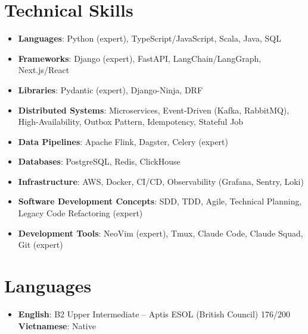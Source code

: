 \documentclass[letterpaper,11pt]{article}
\newcommand{\resumeItem}[2]{
  \item\small{
    \textbf{#1}{: #2 \vspace{-2pt}}
  }
}
\newcommand{\resumeSubHeadingListStart}{\begin{itemize}[leftmargin=*]}
\newcommand{\resumeSubHeadingListEnd}{\end{itemize}}
\begin{document}
%
\section{Technical Skills}
 \resumeSubHeadingListStart
   \resumeItem{Languages}
     {Python (expert), TypeScript/JavaScript, Scala, Java, SQL}
   \resumeItem{Frameworks}
     {Django (expert), FastAPI, LangChain/LangGraph, Next.js/React}
   \resumeItem{Libraries}
     {Pydantic (expert), Django-Ninja, DRF}
   \resumeItem{Distributed Systems}
     {Microservices, Event-Driven (Kafka, RabbitMQ), High-Availability, Outbox Pattern, Idempotency, Stateful Job}
   \resumeItem{Data Pipelines}
     {Apache Flink, Dagster, Celery (expert)}
   \resumeItem{Databases}
     {PostgreSQL, Redis, ClickHouse}
   \resumeItem{Infrastructure}
     {AWS, Docker, CI/CD, Observability (Grafana, Sentry, Loki)}
   \resumeItem{Software Development Concepts}
     {SDD, TDD, Agile, Technical Planning, Legacy Code Refactoring (expert)}
   \resumeItem{Development Tools}
     {NeoVim (expert), Tmux, Claude Code, Claude Squad, Git (expert)}
 \resumeSubHeadingListEnd

\section{Languages}
 \resumeSubHeadingListStart
   \resumeItem{English}
     {B2 Upper Intermediate -- Aptis ESOL (British Council) 176/200 \hfill \textbf{Vietnamese}: Native}
 \resumeSubHeadingListEnd


\end{document}
